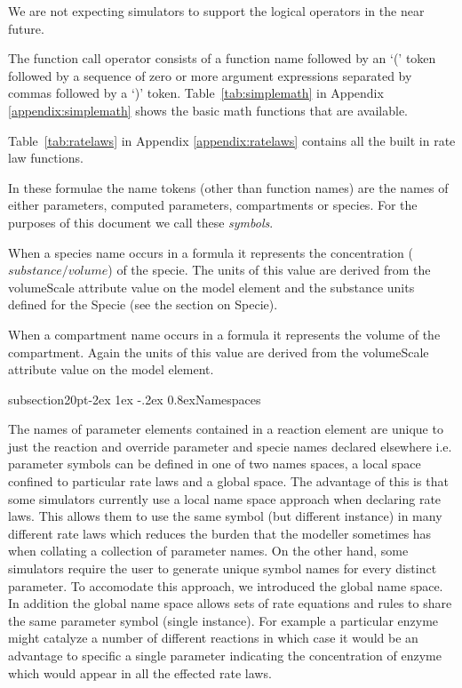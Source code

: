 \documentclass[10pt]{article}
\makeatletter
\renewcommand{\subsection}{\@startsection%
  {subsection}{2}{0pt}{-2ex \@plus 1ex \@minus -.2ex}%
  {0.8ex}{\slshape\large\bfseries}}
\newcommand{\class}[1]{\textsf{#1}}
\newcommand{\attrib}[1]{\textsf{#1}}
\makeatother
\begin{document}
We are not expecting simulators to support the logical operators
in the near future.

The function call operator consists of a function name followed
by an `(' token followed by a sequence of zero or
more argument expressions separated by commas followed by a `)'
token. Table~\ref{tab:simplemath} in Appendix \ref{appendix:simplemath}
shows the basic math functions that are available.

Table~\ref{tab:ratelaws} in Appendix \ref{appendix:ratelaws}
contains all the built in rate law functions.

In these formulae the name tokens (other than function names) are
the names of either parameters, computed parameters, compartments
or species.  For the purposes of this document we call these
\emph{symbols}.

When a species name occurs in a formula it represents the concentration
($substance/volume$) of the specie. The units of this value are
derived from the \attrib{volumeScale} attribute value on the
\class{model} element and the substance units defined for the
\class{Specie} (see the section on Specie).

When a compartment name
occurs in a formula it represents the volume of the compartment. Again the units of
this value are derived from the \attrib{volumeScale} attribute value on the
\class{model} element.

\subsection{Namespaces}
\label{subsection:namespace}

The names of parameter elements contained in a \class{reaction}
element are unique to just the reaction and override parameter
and specie names declared elsewhere i.e. parameter symbols can be defined in one of two names spaces, a local space confined to
particular rate laws and a global space.
The advantage of this is that some simulators currently use a local name space approach when declaring rate laws. This allows them
to use the same symbol (but different instance) in many different rate laws which reduces the burden that the modeller sometimes has
when collating a collection of parameter names. On the other hand, some simulators require the user to generate unique symbol names
for every distinct parameter. To accomodate this approach, we introduced the global name space. In addition the global name space
allows sets of rate equations and rules to share the same parameter symbol (single instance). For example a particular enzyme might
catalyze a number of different reactions in which case it would be an advantage to specific a single parameter indicating the concentration
of enzyme which would appear in all the effected rate laws.
\end{document}
